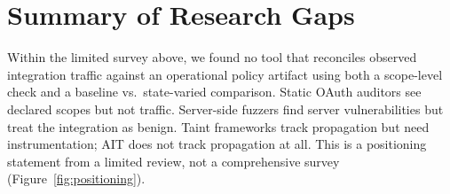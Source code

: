 \documentclass[12pt,a4paper]{report}
\begin{document}
\section{Summary of Research Gaps}

Within the limited survey above, we found no tool that reconciles observed integration traffic
against an operational policy artifact using both a scope-level check and a baseline vs.\
state-varied comparison. Static OAuth auditors \cite{boucher2024} see declared scopes but not
traffic. Server-side fuzzers \cite{restler2019,evomaster2019} find server vulnerabilities but
treat the integration as benign. Taint frameworks \cite{taintdroid2014} track propagation but
need instrumentation; AIT does not track propagation at all. This is a positioning statement from
a limited review, not a comprehensive survey (Figure~\ref{fig:positioning}).
\end{document}
